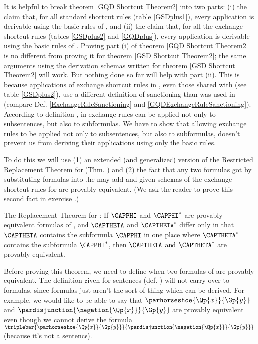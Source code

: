 It is helpful to break theorem \ref{GQD Shortcut Theorem2} into two parts: (i) the claim that, for all standard shortcut rules (table \ref{GSDplus1}), every application is derivable using the basic rules of \GQD{}, and (ii) the claim that, for all the exchange shortcut rules (tables \ref{GSDplus2} and \ref{GQDplus}), every application is derivable using the basic rules of \GQD{}. 
Proving part (i) of theorem \ref{GQD Shortcut Theorem2} is no different from proving it for theorem \ref{GSD Shortcut Theorem2}; the same arguments using the derivation schemas written for theorem \ref{GSD Shortcut Theorem2} will work.
But nothing done so far will help with part (ii).
This is because applications of exchange shortcut rules in \GQDP{}, even those shared with \GSDP{} (see table \ref{GSDplus2}), use a different definition of sanctioning than was used in \GSDP{} (compare Def. \ref{ExchangeRuleSanctioning} and \ref{GQDExchangeRuleSanctioning}). 
According to definition , in \GQDP{} exchange rules can be applied not only to subsentences, but also to subformulas. 
We have to show that allowing exchange rules to be applied not only to subsentences, but also to subformulas, doesn't prevent us from deriving their applications using only the basic rules.

To do this we will use (1) an extended (and generalized) version of the Restricted Replacement Theorem for \GSD{} (Thm. ) and (2) the fact that any two formulas got by substituting \GQL{} formulas into the may-add and given schemas of the exchange shortcut rules for \GQD{} are provably equivalent. 
(We ask the reader to prove this second fact in exercise .)
\begin{THEOREM}{ The Replacement Theorem for \GQD{}:}
If $\CAPPHI$ and $\CAPPHI^*$ are provably equivalent formulas of \GQL{}, and $\CAPTHETA$ and $\CAPTHETA^*$ differ only in that $\CAPTHETA$ contains the subformula $\CAPPHI$ in one place where $\CAPTHETA^*$ contains the subformula $\CAPPHI^*$, then $\CAPTHETA$ and $\CAPTHETA^*$ are provably equivalent.
\end{THEOREM}
\noindent{}Before proving this theorem, we need to define when two formulas of \GQL{} are provably equivalent. 
The definition given for \GSL{} sentences (def. ) will not carry over to \GQL{} formulas, since formulas just aren't the sort of thing which can be derived. 
For example, we would like to be able to say that $\parhorseshoe{\Qp{\variable{x}}}{\Gp{\variable{y}}}$ and $\pardisjunction{\negation{\Qp{\variable{x}}}}{\Gp{\variable{y}}}$ are provably equivalent even though we cannot derive the formula $\triplebar{\parhorseshoe{\Qp{\variable{x}}}{\Gp{\variable{y}}}}{\pardisjunction{\negation{\Qp{\variable{x}}}}{\Gp{\variable{y}}}}$ (because it's not a sentence). 

